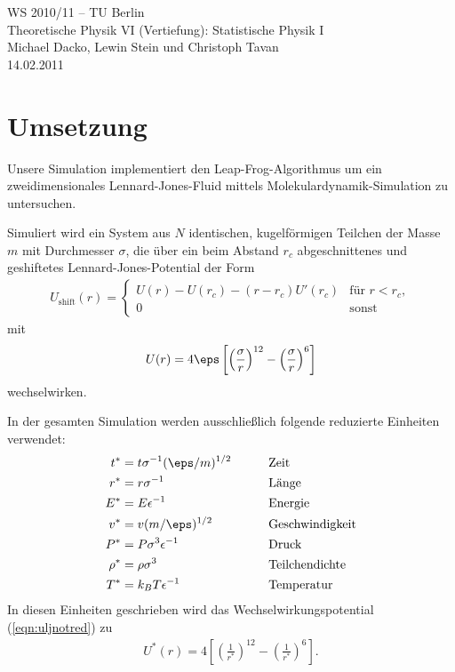 \documentclass[11pt,a4paper]{article}
\newcommand{\ind}[1]{_{\mathrm{#1}}}
\begin{document}

\begin{center}
WS 2010/11 -- TU Berlin\\
Theoretische Physik VI (Vertiefung): Statistische Physik I\\
Michael Dacko, Lewin Stein und Christoph Tavan\\
14.02.2011
\end{center}

\section{Umsetzung}
Unsere Simulation implementiert den Leap-Frog-Algorithmus um ein zweidimensionales Lennard-Jones-Fluid mittels Molekulardynamik-Simulation zu untersuchen.

Simuliert wird ein System aus $N$ identischen, kugelförmigen Teilchen der Masse $m$ mit Durchmesser $\sigma$, die über ein beim Abstand $r_c$ abgeschnittenes und geshiftetes Lennard-Jones-Potential der Form
\begin{align}
	U\ind{shift}(r) = 
	\begin{cases} 
	U(r) - U(r_c) - (r - r_c) U'(r_c) & \text{für $r < r_c$},\\ 
	0& \text{sonst}
	\end{cases}
\end{align}
mit
\begin{align}
	U(r)=4 \eps \left[ \left( \frac{\sigma}{r}  \right)^{12} - \left( \frac{\sigma}{r}  \right)^6 \right] \label{eqn:uljnotred}
\end{align}
wechselwirken.

In der gesamten Simulation werden ausschließlich folgende reduzierte Einheiten verwendet:
\begin{alignat*}{2}
t^* &= t \sigma^{-1} (\eps/m)^{1/2} &\quad\quad&\text{Zeit}\\
r^* &= r \sigma^{-1} &\quad\quad&\text{Länge}\\
E^* &= E \epsilon^{-1} &&\text{Energie}\\
v^* &= v (m/\eps)^{1/2} &\quad\quad&\text{Geschwindigkeit}\\
P^* &= P \sigma^3 \epsilon^{-1} &&\text{Druck}\\
\rho^* &= \rho \sigma^3 && \text{Teilchendichte}\\
T^* &= k_B T \epsilon^{-1} && \text{Temperatur}
\end{alignat*}
In diesen Einheiten geschrieben wird das Wechselwirkungspotential (\ref{eqn:uljnotred}) zu
\begin{align}
	U^*(r) = 4 \left[ \left( \frac{1}{r^*}  \right)^{12} - \left( \frac{1}{r^*}  \right)^6 \right] \label{eqn:ulj}.
\end{align}
\end{document}
